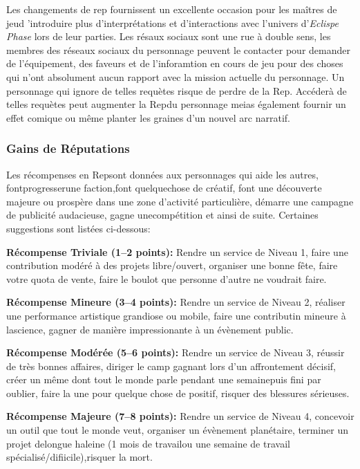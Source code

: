 {Les changements de rep fournissent un excellente occasion pour les maîtres de jeud 'introduire plus d'interprétations et d'interactions avec l'univers d'\textit{Eclispe Phase} lors de leur parties. Les résaux sociaux sont une rue à double sens, les membres des réseaux sociaux du personnage peuvent le contacter pour demander de l'équipement, des faveurs et de l'inforamtion en cours de jeu pour des choses qui n'ont absolument aucun rapport avec la mission actuelle du personnage. Un personnage qui ignore de telles requètes risque de perdre de la Rep. Accéderà de telles requètes peut augmenter la Repdu personnage meias également fournir un effet comique ou même planter les graines d'un nouvel arc narratif. 

\subsubsection{Gains de Réputations} 

Les récompenses en Repsont données aux personnages qui aide les autres, fontprogresserune faction,font quelquechose de créatif, font une découverte majeure ou prospère dans une zone d'activité particulière, démarre une campagne de publicité audacieuse, gagne unecompétition et ainsi de suite. Certaines suggestions sont listées ci-dessous: 

\textbf{Récompense Triviale (1–2 points):} Rendre un service de Niveau 1, faire une contribution modéré à des projets libre/ouvert, organiser une bonne fête, faire votre quota de vente, faire le boulot que personne d'autre ne voudrait faire. 

\textbf{Récompense Mineure (3–4 points):} Rendre un service de Niveau 2, réaliser une performance artistique grandiose ou mobile, faire une contributin mineure à lascience, gagner de manière impressionante à un évènement public. 

\textbf{Récompense Modérée (5–6 points):} Rendre un service de Niveau 3, réussir de très bonnes affaires, diriger le camp gagnant lors d'un affrontement décisif, créer un même dont tout le monde parle pendant une semainepuis fini par oublier, faire la une pour quelque chose de positif, risquer des blessures sérieuses. 

\textbf{Récompense Majeure (7–8 points):} Rendre un service de Niveau 4, concevoir un outil que tout le monde veut, organiser un évènement planétaire, terminer un projet delongue haleine (1 mois de travailou une semaine de travail spécialisé/difiicile),risquer la mort. 

}
